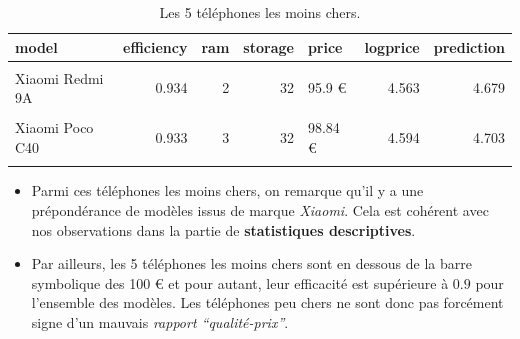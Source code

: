\documentclass[
  12pt,
]{report}
\begin{document}
\begin{table}[!h]

\caption{\label{tab:kbl_expensive}Les 5 téléphones les moins chers.}
\centering
\begin{tabular}[t]{lrrrlrr}
\toprule
\textbf{model} & \textbf{efficiency} & \textbf{ram} & \textbf{storage} & \textbf{price} & \textbf{logprice} & \textbf{prediction}\\
\midrule
\cellcolor{gray!6}{Xiaomi Redmi A1} & \cellcolor{gray!6}{0.935} & \cellcolor{gray!6}{2} & \cellcolor{gray!6}{32} & \cellcolor{gray!6}{91.4 €} & \cellcolor{gray!6}{4.515} & \cellcolor{gray!6}{4.640}\\
Xiaomi Redmi 9A & 0.934 & 2 & 32 & 95.9 € & 4.563 & 4.679\\
\cellcolor{gray!6}{Xiaomi Redmi 9AT} & \cellcolor{gray!6}{0.946} & \cellcolor{gray!6}{2} & \cellcolor{gray!6}{32} & \cellcolor{gray!6}{96.91 €} & \cellcolor{gray!6}{4.574} & \cellcolor{gray!6}{4.814}\\
Xiaomi Poco C40 & 0.933 & 3 & 32 & 98.84 € & 4.594 & 4.703\\
\cellcolor{gray!6}{Motorola E13} & \cellcolor{gray!6}{0.930} & \cellcolor{gray!6}{2} & \cellcolor{gray!6}{64} & \cellcolor{gray!6}{99 €} & \cellcolor{gray!6}{4.595} & \cellcolor{gray!6}{4.680}\\
\bottomrule
\end{tabular}
\end{table}

\begin{itemize}
\item
  Parmi ces téléphones les moins chers, on remarque qu'il y a une
  prépondérance de modèles issus de marque \emph{Xiaomi}. Cela est
  cohérent avec nos observations dans la partie de \textbf{statistiques
  descriptives}.
\item
  Par ailleurs, les 5 téléphones les moins chers sont en dessous de la
  barre symbolique des 100 € et pour autant, leur efficacité est
  supérieure à \(0.9\) pour l'ensemble des modèles. Les téléphones peu
  chers ne sont donc pas forcément signe d'un mauvais \emph{rapport
  ``qualité-prix''}.
\end{itemize}
\end{document}
